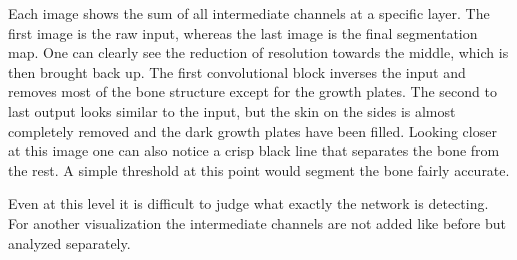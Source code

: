 Each image shows the sum of all intermediate channels at a specific layer. The first image is the raw input, whereas the last image is the final segmentation map. One can clearly see the reduction of resolution towards the middle, which is then brought back up. The first convolutional block inverses the input and removes most of the bone structure except for the growth plates. The second to last output looks similar to the input, but the skin on the sides is almost completely removed and the dark growth plates have been filled. Looking closer at this image one can also notice a crisp black line that separates the bone from the rest. A simple threshold at this point would segment the bone fairly accurate.

Even at this level it is difficult to judge what exactly the network is detecting. For another visualization the intermediate channels are not added like before but analyzed separately.

